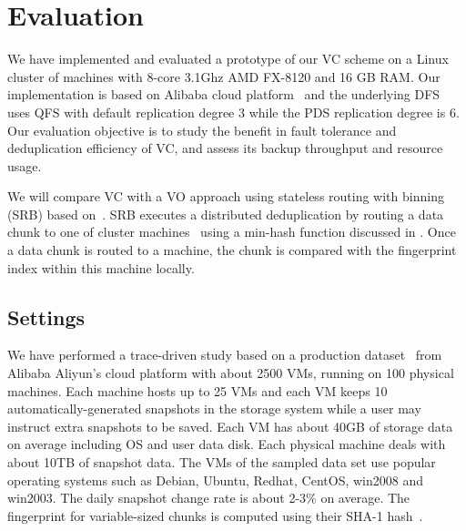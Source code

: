 \section{Evaluation}
\label{sect:evaluation}
We have implemented and evaluated a prototype of our VC scheme on a Linux cluster of machines with
8-core 3.1Ghz AMD FX-8120 and 16 GB RAM. 
Our implementation is based on Alibaba cloud platform~\cite{Aliyun,WeiZhangIEEE}
and the underlying DFS uses  QFS with default replication degree 3 while the PDS replication degree is 6.
Our evaluation objective is to
study the benefit in fault tolerance and   deduplication efficiency of VC,  
and assess its backup throughput and  resource usage. 

We will compare VC with a VO approach  using stateless routing with binning (SRB) 
based on~\cite{Dong2011,extreme_binning09}.
SRB executes a distributed deduplication by routing a data chunk to one of cluster machines~\cite{Dong2011}
using  a min-hash function discussed in \cite{extreme_binning09}. Once a data chunk is routed to
a machine, the chunk is compared with the fingerprint index within this machine locally. 

\subsection{Settings}
We have performed a trace-driven study based on a production dataset~\cite{WeiZhangIEEE} from 
Alibaba Aliyun's cloud platform with about 2500 VMs, running on 100 physical machines. 
Each machine hosts up to 25 VMs and each VM keeps 10 automatically-generated snapshots in the storage 
system while a user may instruct extra snapshots to be saved.
Each VM has about 40GB of storage  data  on average
including OS and user data disk.
Each physical machine deals with about 10TB of snapshot data.
The VMs of the sampled data set use popular operating systems such as 
Debian, Ubuntu, Redhat, CentOS, win2008 and win2003. 
The daily snapshot change rate is about 2-3\% on average.
The fingerprint for variable-sized chunks is computed using their SHA-1 hash~\cite{similar94,rabin81}. 


